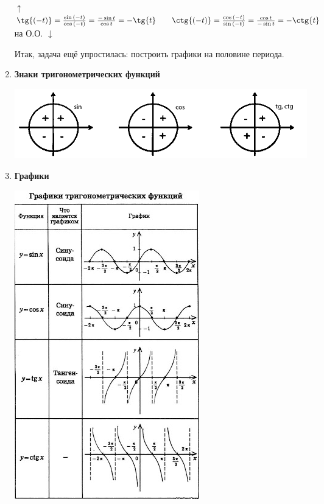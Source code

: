 \documentclass{article}
\begin{document}
\begin{enumerate}
            \(\uparrow\) \(\tg{(-t)} = \frac{\sin{(-t)}}{\cos{(-t)}} = \frac{-\sin{t}}{\cos{t}} = -\tg{t} \qquad \ctg{(-t)} = \frac{\cos{(-t)}}{\sin{(-t)}} = \frac{\cos{t}}{-\sin{t}} = -\ctg{t}\) на О.О. \(\downarrow\)
            
            Итак, задача ещё упростилась: построить графики на половине периода.
            
            \item \textbf{Знаки тригонометрических функций}
            
            \includegraphics[scale=0.4]{1}
            
            \item \textbf{Графики}
            
            \begin{center}
                \includegraphics[scale=0.9]{2}
            \end{center}
            
        \end{enumerate}
        
\end{document}
